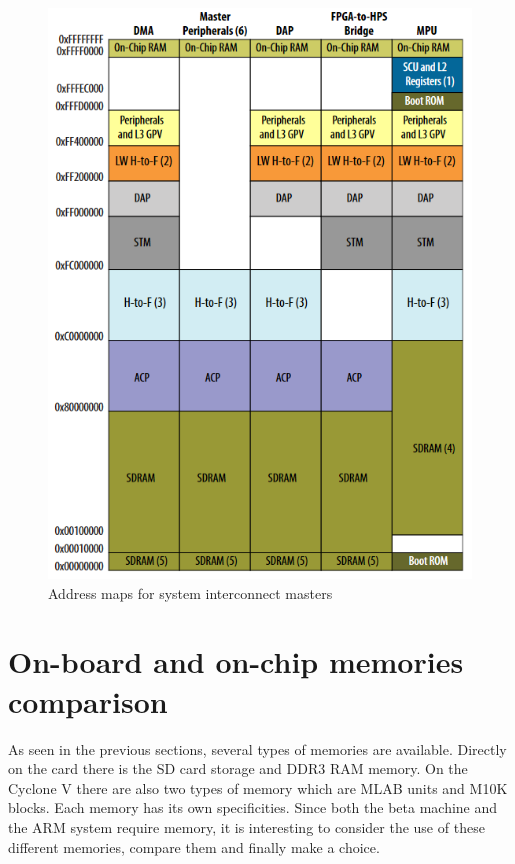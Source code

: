 \begin{figure}[H]
    \centering
    \includegraphics[scale=0.6]{Chapter1-Hardware/res/hps_address_space.PNG}
    \caption{Address maps for system interconnect masters}
    \label{fig:cyc5/address_space}
\end{figure}

\section{On-board and on-chip memories comparison}

As seen in the previous sections, several types of memories are available. Directly on the card 
there is the SD card storage and DDR3 RAM memory. On the Cyclone V there are also two types of memory 
which are MLAB units and M10K blocks. Each memory has its own specificities. Since both the beta 
machine and the ARM system require memory, it is interesting to consider the use of these different 
memories, compare them and finally make a choice.

